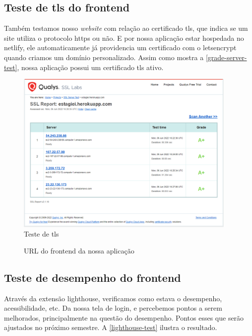 \subsection{Teste de \ac{tls} do \gls{frontend}}
Também testamos nosso \emph{website} com relação ao certificado \ac{tls}, que indica se um site utiliza o protocolo \ac{https} ou não. E por nossa aplicação estar hospedada no \gls{netlify}, ele automaticamente já providencia um certificado com o \gls{letsencrypt} quando criamos um domínio personalizado. Assim como mostra a \autoref{grade-server-test}, nossa aplicação possui um certificado \ac{tls} ativo.

\begin{figure}[H]
	\centering
	\caption{\label{grade-server-test}Teste de \ac{tls}}
	\includegraphics[width=0.95\textwidth]{../imagens/web-tests/grade-server-test.png}
\end{figure}

\begin{figure}[htb]
	\caption{\label{qr-url-frontend}URL do \gls{frontend} da nossa aplicação}
	\begin{center}
	\end{center}
\end{figure}

\subsection{Teste de desempenho do \gls{frontend}}
Através da extensão \gls{lighthouse}, verificamos como estava o desempenho, acessibilidade, etc. Da nossa tela de login, e percebemos pontos a serem melhorados, principalmente na questão do desempenho. Pontos esses que serão ajustados no próximo semestre. A \autoref{lighthouse-test} ilustra o resultado.

